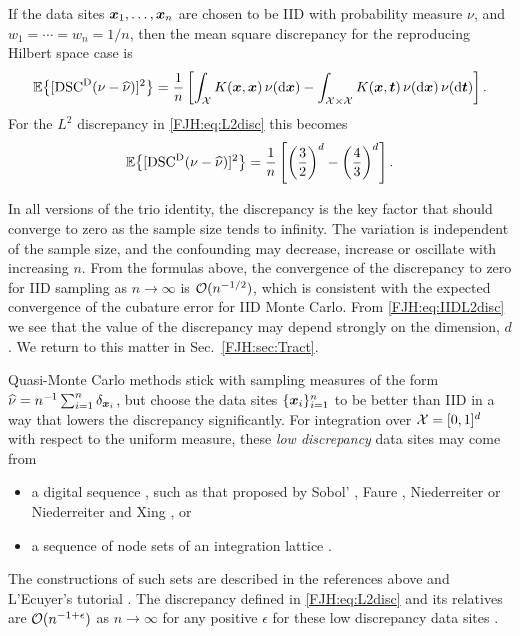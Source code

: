 \documentclass[graybox,footinfo]{svmult}
\begin{document}
If the data sites  ${\boldsymbol{x}}_{1}, \ldots, {\boldsymbol{x}}_{n}$ are chosen to be IID with probability measure 
$\nu$, and $w_1 = \cdots = w_n = 1/n$, then 
the mean square discrepancy for 
the reproducing Hilbert space case is
\begin{equation*}
{\mathbb{E}} \bigl\{[\textup{DSC}^{\textup{D}}(\nu - \widehat{\nu})]^2 \bigr \}  = \frac 1 n \left [ \int_{{\mathcal{X}}} K({\boldsymbol{x}},{\boldsymbol{x}}) \, 
\nu(\mathrm{d} 
{\boldsymbol{x}}) - 
\int_{{\mathcal{X}} \times {\mathcal{X}}} K({\boldsymbol{x}},{\boldsymbol{t}}) \, \nu(\mathrm{d} {\boldsymbol{x}}) \, \nu (\mathrm{d} {\boldsymbol{t}}) \right ].
\end{equation*}
For the $L^2$ discrepancy in \eqref{FJH:eq:L2disc} this becomes 
\begin{equation} \label{FJH:eq:IIDL2disc}
\bbE \bigl\{[\disc^{\Dt}(\nu - \hnu)]^2 \bigr \} = \frac 1 n \left [ \left(\frac 32\right)^d - 
\left(\frac 43\right)^d \right ].
\end{equation}

In all versions of the trio identity, the discrepancy is the key factor that should converge 
to 
zero as the sample size tends to infinity.  The variation is independent of the sample 
size, and the confounding may decrease, increase or oscillate with increasing $n$.  From 
the formulas above, the convergence of the discrepancy to zero for IID sampling as $n 
\to 
\infty$ is  ${\mathcal{O}}(n^{-1/2})$, which is consistent with the expected convergence of the 
cubature error for IID Monte Carlo.  From \eqref{FJH:eq:IIDL2disc} we see that the 
value of the discrepancy may depend strongly on the dimension, $d$.  We return 
to this matter in Sec.\  \ref{FJH:sec:Tract}.

Quasi-Monte Carlo methods stick with sampling measures of the form  $\widehat{\nu} = 
n^{-1}\sum_{i=1}^n \delta_{{\boldsymbol{x}}_i}$, but choose the data sites $\{{\boldsymbol{x}}_i\}_{i=1}^n$ to be 
better than IID in a way that lowers the discrepancy significantly.  For 
integration over ${\mathcal{X}} = [0,1]^d$ with 
respect to the uniform measure, these \emph{low discrepancy} data sites may come from
\begin{itemize} 
\item a digital sequence \cite{DicPil10a}, such as that proposed by Sobol' \cite{Sob67}, 
Faure \cite{Fau82}, Niederreiter \cite{Nie88} or Niederreiter and Xing \cite{NieXin96}, or 
\item a sequence of node sets of an integration lattice \cite{SloJoe94}.  
\end{itemize}
The 
constructions of such sets are described in the references above and L'Ecuyer's 
tutorial 
\cite{}.  The discrepancy defined in \eqref{FJH:eq:L2disc} and its relatives are 
${\mathcal{O}}(n^{-1+\epsilon})$ as $n \to \infty$ for any positive $\epsilon$ for these low 
discrepancy data sites \cite{Nie92}.  
\end{document}
